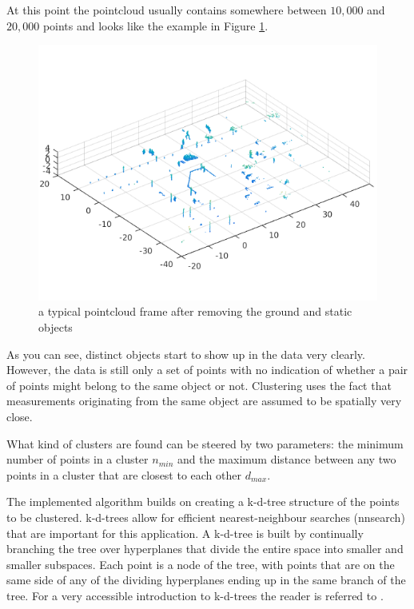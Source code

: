 At this point the pointcloud usually contains somewhere between $10,000$ and $20,000$ points and looks like the example in Figure \ref{fig:cloud_before_clustering}. 

\begin{figure}[H]
\centering
\includegraphics[width = .9\textwidth]{include/images/cloud_before_clustering.png}
\caption{a typical pointcloud frame after removing the ground and static objects}
\label{fig:cloud_before_clustering}
\end{figure}

As you can see, distinct objects start to show up in the data very clearly. However, the data is still only a set of points with no indication of whether a pair of points might belong to the same object or not. Clustering uses the fact that measurements originating from the same object are assumed to be spatially very close.

What kind of clusters are found can be steered by two parameters: the minimum number of points in a cluster $n_{min}$ and the maximum distance between any two points in a cluster that are closest to each other $d_{max}$. 

The implemented algorithm builds on creating a k-d-tree structure of the points to be clustered. k-d-trees allow for efficient nearest-neighbour searches (nnsearch) that are important for this application. A k-d-tree is built by continually branching the tree over hyperplanes that divide the entire space into smaller and smaller subspaces. Each point is a node of the tree, with points that are on the same side of any of the dividing hyperplanes ending up in the same branch of the tree. For a very accessible introduction to k-d-trees the reader is referred to \cite{Moore_1991_2818_kd}.

